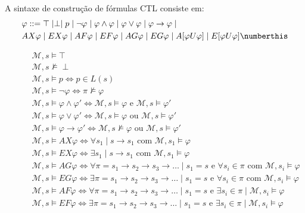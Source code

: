 A sintaxe de construção de fórmulas CTL consiste em:
\begin{align*}
& \varphi ::= \top \mid \perp \mid p \mid \neg \varphi \mid \varphi \wedge \varphi \mid \varphi\vee\varphi \mid \varphi \to \varphi \mid \\
& AX\varphi \mid EX\varphi \mid AF\varphi \mid EF\varphi \mid AG\varphi \mid EG\varphi \mid A[\varphi U \varphi]\mid E[\varphi U \varphi]
\numberthis
\end{align*}

\begin{figure}[ht]
	\centering
	\begin{eqnarray}
	\mathcal{M},s  \models  \top && \\
	\mathcal{M},s  \not\models  \perp && \\
	\mathcal{M},s  \models  p \iff p \in L(s) && \\
	\mathcal{M},s  \models  \neg \varphi \iff \pi \not \models \varphi && \\
	\mathcal{M},s  \models  \varphi \wedge \varphi' \iff \mathcal{M},s \models \varphi \mbox{ e } \mathcal{M},s \models \varphi' && \\
	\mathcal{M},s  \models  \varphi \vee \varphi' \iff \mathcal{M},s \models \varphi \mbox{ ou } \mathcal{M},s \models \varphi' && \\
	\mathcal{M},s  \models  \varphi \to \varphi' \iff \mathcal{M},s \not\models \varphi \mbox{ ou } \mathcal{M},s \models \varphi' && \\
	\mathcal{M},s  \models  AX\varphi \iff \forall s_1 \mid s\to s_1 \mbox{ com } \mathcal{M}, s_1 \models \varphi && \\
	\mathcal{M},s  \models  EX\varphi \iff \exists s_1 \mid s\to s_1 \mbox{ com } \mathcal{M}, s_1 \models \varphi && \\
	\mathcal{M},s  \models  AG\varphi \iff \forall \pi = s_1\to s_2\to s_3\to \dots \mid s_1 = s \mbox{ e } \forall s_i \in \pi \mbox{ com } \mathcal{M}, s_i \models \varphi && \\
	\mathcal{M},s  \models  EG\varphi \iff \exists \pi = s_1\to s_2\to s_3\to \dots \mid s_1 = s \mbox{ e } \forall s_i \in \pi \mbox{ com } \mathcal{M}, s_i \models \varphi && \\
	\mathcal{M},s  \models  AF\varphi \iff \forall \pi = s_1\to s_2\to s_3\to \dots \mid s_1 = s \mbox{ e } \exists s_i \in \pi \mid \mathcal{M}, s_i \models \varphi && \\
	\mathcal{M},s  \models  EF\varphi \iff \exists \pi = s_1\to s_2\to s_3\to \dots \mid s_1 = s \mbox{ e } \exists s_i \in \pi \mid \mathcal{M}, s_i \models \varphi && \\

\end{eqnarray}
\end{figure}
